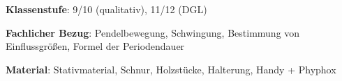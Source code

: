 \documentclass[../main.tex]{subfiles}
\begin{document}
\begin{tcolorbox}[
    width=\textwidth,
    height=\textheight,
    title=Phyphox: Fadenpendel,
    fonttitle=\Large,
    before title=\vspace{0.2cm}, after title=\vspace{0.2cm},
    colback=white,
    title filled=true, 
    colbacktitle=myorange,
    colframe=black,
    coltitle=black,
    ]

    \vspace{0.2cm}
    \begin{minipage}[]{0.75\textwidth}

        \textbf{Klassenstufe}: 9/10 (qualitativ), 11/12 (DGL)

        \vspace{0.5cm}

        \textbf{Fachlicher Bezug}: Pendelbewegung, Schwingung, Bestimmung von Einflussgrößen, Formel der Periodendauer

        \vspace{0.5cm}
        \textbf{Material}: Stativmaterial, Schnur, Holzstücke, Halterung, Handy + Phyphox


\end{minipage}
\end{tcolorbox}
\end{document}
